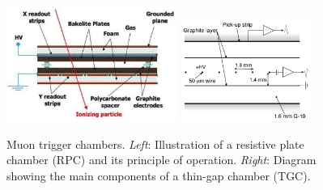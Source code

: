 
\begin{figure}[!htb]
    \begin{center}
        \includegraphics[width=0.5\textwidth]{figures/chapter2/muon_spec/rpc_chamber}
        \includegraphics[width=0.38\textwidth]{figures/chapter2/muon_spec/tgc_chamber}
        \caption{
            Muon trigger chambers.
            \textit{Left}: Illustration of a resistive plate chamber (RPC) and its principle of operation.
            \textit{Right}: Diagram showing the main components of a thin-gap chamber (TGC).
        }
        \label{fig:muon_trigger_chamber}
    \end{center}
\end{figure}
